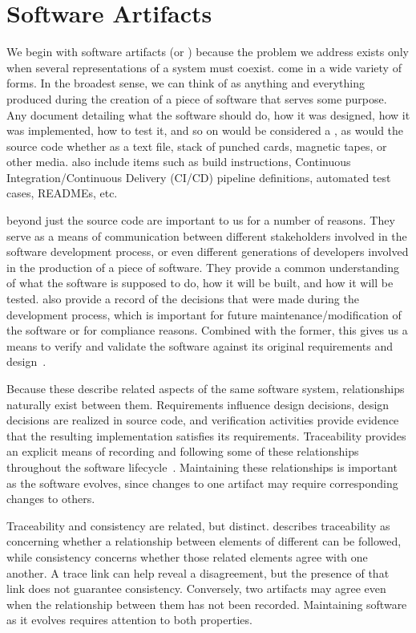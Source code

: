 \section{Software Artifacts}
\label{sec:sfs}

We begin with software artifacts (or \sfs{}) because the problem we address
exists only when several representations of a system must coexist.
\SFS{} come in a wide variety of forms. In the broadest sense, we can think of
\sfs{} as anything and everything produced during the creation of a piece of
software that serves some purpose. Any
document detailing what the software
should do, how it was designed, how it was implemented, how to test it, and so 
on would be considered a \sf{}, as would the source code whether as a text 
file, stack of punched cards, magnetic tapes, or other media. \SFS{} also 
include items such as build instructions, Continuous Integration/Continuous 
Delivery (CI/CD) pipeline definitions, automated test cases, READMEs, etc.

\SFS{} beyond just the source code are important to us for a number of reasons. 
They serve as a means of communication between different stakeholders 
involved in the software development process, or even different generations of 
developers involved in the production of a piece of software. They provide a 
common understanding of what the software is supposed to do, how it will be 
built, and how it will be tested. \SFS{} also provide a record of the decisions 
that were made during the development process, which is important for future 
maintenance/modification of the software or for compliance reasons. Combined 
with the former, this gives us a means to verify and validate the software 
against its original requirements and
design~\citep{Parnas2010,ParnasAndClements1986,CourtoisAndParnas1993}.

Because these \sfs{} describe related aspects of the same software system, 
relationships naturally exist between them. Requirements influence design 
decisions, design decisions are realized in source code, and verification 
activities provide evidence that the resulting implementation satisfies its 
requirements. Traceability provides an explicit means of recording and 
following some of these relationships throughout the software
lifecycle~\citep{GotelAndFinkelstein1994,WinklerAndPilgrim2010}. Maintaining these
relationships is important as the software evolves, since changes to one 
artifact may require corresponding changes to others.

Traceability and consistency are related, but distinct.
\citet{Galster2011} describes traceability as concerning whether a relationship
between elements of different \sfs{} can be followed, while consistency
concerns whether those related elements agree with one another. A trace link
can help reveal a disagreement, but
the presence of that link does not guarantee consistency. Conversely, two
artifacts may agree even when the relationship between them has not been
recorded. Maintaining software as it evolves requires attention to both
properties.

